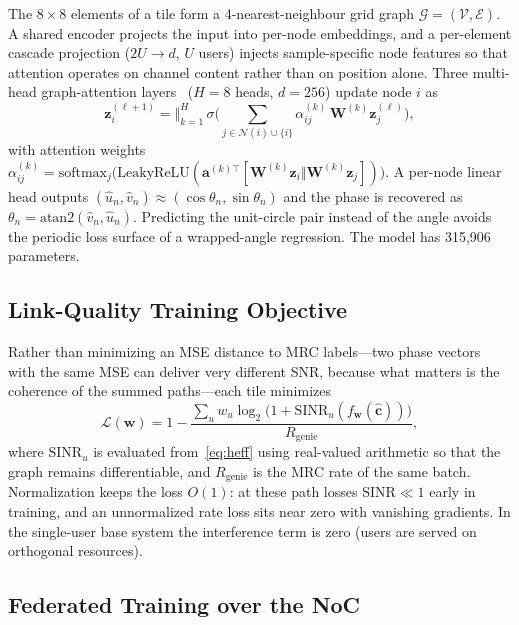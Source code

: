 \documentclass[conference]{IEEEtran}
\begin{document}
The $8\times8$ elements of a tile form a 4-nearest-neighbour grid graph $\mathcal{G}=(\mathcal{V},\mathcal{E})$. A shared encoder projects the input into per-node embeddings, and a per-element cascade projection ($2U\!\rightarrow\! d$, $U$ users) injects sample-specific node features so that attention operates on channel content rather than on position alone. Three multi-head graph-attention layers~\cite{velickovic2018} ($H=8$ heads, $d=256$) update node $i$ as
\begin{equation}
\bm{z}_i^{(\ell+1)} = \Big\Vert_{k=1}^{H}\,\sigma\Big(\sum_{j\in\mathcal{N}(i)\cup\{i\}} \alpha_{ij}^{(k)}\,\bm{W}^{(k)}\bm{z}_j^{(\ell)}\Big),
\label{eq:gat}
\end{equation}
with attention weights $\alpha_{ij}^{(k)}=\mathrm{softmax}_j\big(\mathrm{LeakyReLU}(\bm{a}^{(k)\top}[\bm{W}^{(k)}\bm{z}_i\Vert\bm{W}^{(k)}\bm{z}_j])\big)$. A per-node linear head outputs $(\hat{u}_n,\hat{v}_n)\approx(\cos\theta_n,\sin\theta_n)$ and the phase is recovered as $\theta_n=\mathrm{atan2}(\hat{v}_n,\hat{u}_n)$. Predicting the unit-circle pair instead of the angle avoids the periodic loss surface of a wrapped-angle regression. The model has 315,906 parameters.

\subsection{Link-Quality Training Objective}

Rather than minimizing an MSE distance to MRC labels---two phase vectors with the same MSE can deliver very different SNR, because what matters is the coherence of the summed paths---each tile minimizes
\begin{equation}
\mathcal{L}(\bm{w}) = 1 - \frac{\sum_{u} w_u \log_2\!\big(1 + \mathrm{SINR}_u(f_{\bm{w}}(\hat{\bm{c}}))\big)}{R_\text{genie}},
\label{eq:loss}
\end{equation}
where $\mathrm{SINR}_u$ is evaluated from~\eqref{eq:heff} using real-valued arithmetic so that the graph remains differentiable, and $R_\text{genie}$ is the MRC rate of the same batch. Normalization keeps the loss $O(1)$: at these path losses $\mathrm{SINR}\ll1$ early in training, and an unnormalized rate loss sits near zero with vanishing gradients. In the single-user base system the interference term is zero (users are served on orthogonal resources).

\subsection{Federated Training over the NoC}
\end{document}
